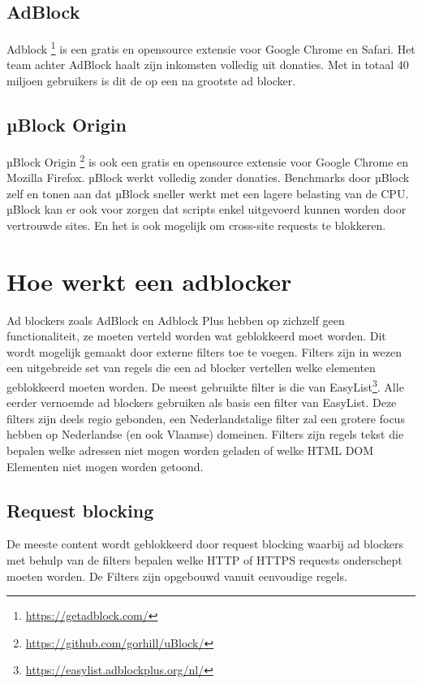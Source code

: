 \documentclass[pdftex,a4paper,12pt,twoside]{report}
\begin{document}
\section{AdBlock}
\label{sec:AdBlock}
Adblock \footnote{\url{https://getadblock.com/}} is een gratis en opensource extensie voor Google Chrome en Safari. Het team achter AdBlock haalt zijn inkomsten volledig uit donaties. Met in totaal 40 miljoen gebruikers is dit de op een na grootste ad blocker.

\section{µBlock Origin}
\label{sec:uBlock Origin}%
µBlock Origin \footnote{\url{https://github.com/gorhill/uBlock/}} is ook een gratis en opensource extensie voor Google Chrome en Mozilla Firefox. µBlock werkt volledig zonder donaties. Benchmarks door µBlock zelf en \citep{PerformanceAB} tonen aan dat µBlock sneller werkt met een lagere belasting van de CPU. µBlock kan er ook voor zorgen dat scripts enkel uitgevoerd kunnen worden door vertrouwde sites. En het is ook mogelijk om \glspl{cross-site request} te blokkeren.



\chapter{Hoe werkt een adblocker}
\label{ch:Hoe werkt een adblocker}
Ad blockers zoals AdBlock en Adblock Plus hebben op zichzelf geen functionaliteit, ze moeten verteld worden wat geblokkeerd moet worden. Dit wordt mogelijk gemaakt door externe filters toe te voegen. Filters zijn in wezen een uitgebreide set van regels die een ad blocker vertellen welke elementen geblokkeerd moeten worden. De meest gebruikte filter is die van EasyList\footnote{\url{https://easylist.adblockplus.org/nl/}}. Alle eerder vernoemde ad blockers gebruiken als basis een filter van EasyList. Deze filters zijn deels regio gebonden, een Nederlandstalige filter zal een grotere focus hebben op Nederlandse (en ook Vlaamse) domeinen. Filters zijn regels tekst die bepalen welke adressen niet mogen worden geladen of welke HTML DOM Elementen niet mogen worden getoond.

\section{Request blocking}
\label{sec:Request blocking}
De meeste content wordt geblokkeerd door request blocking waarbij ad blockers met behulp van de filters bepalen welke HTTP of HTTPS requests onderschept moeten worden. De Filters zijn opgebouwd vanuit eenvoudige regels.
\end{document}
